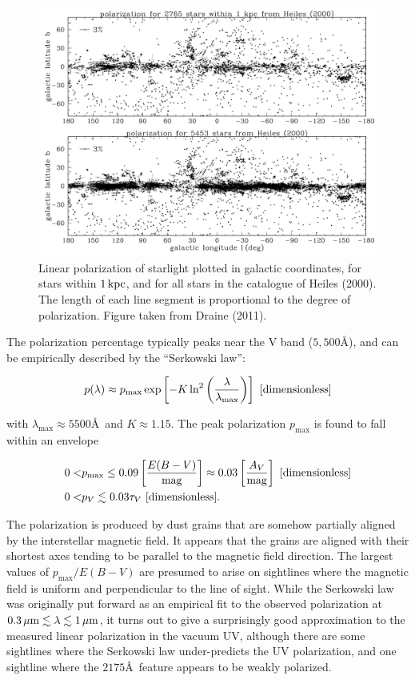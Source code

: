 \documentclass[a4paper,10pt]{article}
\begin{document}
\begin{figure}[t]
    \centering
    \includegraphics[width=14cm]{figures/starpol.png}
    \caption{\footnotesize{Linear polarization of starlight plotted in galactic coordinates, for stars within $1\,{\rm kpc}$, and for all stars in the catalogue of Heiles (2000). The length of each line segment is proportional to the degree of polarization. Figure taken from Draine (2011).}}
    \label{fig:starpol}
\end{figure}

{\noindent}The polarization percentage typically peaks near the V band ($5,500$\AA), and can be empirically described by the ``Serkowski law'':

\begin{align*}
    p(\lambda) \approx p_\mathrm{max}\exp \left[-K\ln^2\left(\frac{\lambda}{\lambda_\mathrm{max}}\right)\right] ~ [{\rm dimensionless}]
\end{align*}

{\noindent}with $\lambda_\mathrm{max}\approx5500$\AA~and $K\approx1.15$. The peak polarization $p_\mathrm{max}$ is found to fall within an envelope

\begin{align*}
    0 < &p_\mathrm{max} \leq 0.09 \left[\frac{E(B-V)}{{\rm mag}}\right] \approx 0.03\left[\frac{A_V}{{\rm mag}}\right] ~ [{\rm dimensionless}] \\
    0 < &p_V \lesssim 0.03\tau_V ~ [{\rm dimensionless}].
\end{align*}

{\noindent}The polarization is produced by dust grains that are somehow partially aligned by the interstellar magnetic field. It appears that the grains are aligned with their shortest axes tending to be parallel to the magnetic field direction. The largest values of $p_\mathrm{max}/E(B-V)$ are presumed to arise on sightlines where the magnetic field is uniform and perpendicular to the line of sight. While the Serkowski law was originally put forward as an empirical fit to the observed polarization at $0.3\,\mu{\rm m}\lesssim \lambda \lesssim 1\,\mu{\rm m}$, it turns out to give a surprisingly good approximation to the measured linear polarization in the vacuum UV, although there are some sightlines where the Serkowski law under-predicts the UV polarization, and one sightline where the $2175$\AA~feature appears to be weakly polarized.
\end{document}
